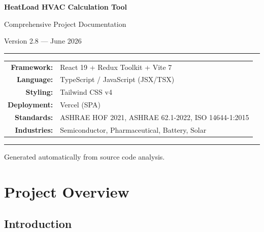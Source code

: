 \documentclass[12pt, a4paper, oneside]{report}
\begin{document}
\begin{titlepage}
  \centering
  \vspace*{2cm}
  {\Huge\bfseries\textcolor{sectionblue}{HeatLoad HVAC Calculation Tool}\par}
  \vspace{0.5cm}
  {\Large\textcolor{codegray}{Comprehensive Project Documentation}\par}
  \vspace{1.5cm}
  {\large\textcolor{codegray}{Version 2.8 — June 2026}\par}
  \vspace{2cm}

  \rule{\textwidth}{0.4pt}
  \vspace{0.5cm}

  {\large
  \begin{tabular}{rl}
    \textbf{Framework:}   & React 19 + Redux Toolkit + Vite 7 \\
    \textbf{Language:}     & TypeScript / JavaScript (JSX/TSX) \\
    \textbf{Styling:}      & Tailwind CSS v4 \\
    \textbf{Deployment:}   & Vercel (SPA) \\
    \textbf{Standards:}    & ASHRAE HOF 2021, ASHRAE 62.1-2022, ISO 14644-1:2015 \\
    \textbf{Industries:}   & Semiconductor, Pharmaceutical, Battery, Solar \\
  \end{tabular}
  }

  \vspace{2cm}
  \rule{\textwidth}{0.4pt}
  \vfill
  {\small Generated automatically from source code analysis.}
\end{titlepage}

\tableofcontents
\newpage

\chapter{Project Overview}

\section{Introduction}
\end{document}
